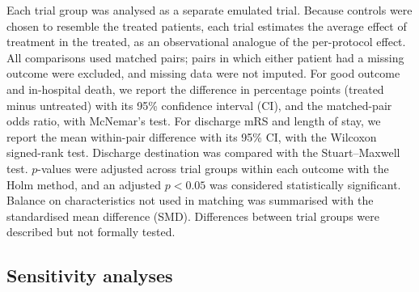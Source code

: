 Each trial group was analysed as a separate emulated trial. Because controls were chosen to resemble the treated patients, each trial estimates the average effect of treatment in the treated, as an observational analogue of the per-protocol effect. All comparisons used matched pairs; pairs in which either patient had a missing outcome were excluded, and missing data were not imputed. For good outcome and in-hospital death, we report the difference in percentage points (treated minus untreated) with its 95\% confidence interval (CI), and the matched-pair odds ratio, with McNemar's test\cite{mcnemar_note_1947}. For discharge mRS and length of stay, we report the mean within-pair difference with its 95\% CI, with the Wilcoxon signed-rank test\cite{wilcoxon_individual_1945}. Discharge destination was compared with the Stuart--Maxwell test\cite{stuart_test_1955, maxwell_comparing_1970}. $p$-values were adjusted across trial groups within each outcome with the Holm method\cite{holm_simple_1979}, and an adjusted $p < 0.05$ was considered statistically significant. Balance on characteristics not used in matching was summarised with the standardised mean difference (SMD). Differences between trial groups were described but not formally tested.

\subsection{Sensitivity analyses}

